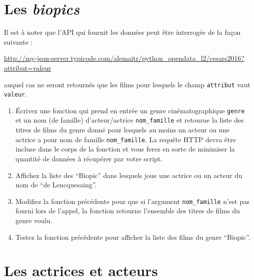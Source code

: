 \documentclass[11pt,a4paper]{article}
\begin{document}
\section{Les \emph{biopics}}

Il est à noter que l'API qui fournit les données peut être interrogée de la façon suivante :
\begin{center}
    \url{http://my-json-server.typicode.com/alemaitr/python_opendata_l2/cesars2016?attribut=valeur}
\end{center}
auquel cas ne seront retournés que les films pour lesquels le champ \verb+attribut+ vaut \verb+valeur+.


\begin{enumerate}
    \item Écrivez une fonction qui prend en entrée un genre cinématographique \verb+genre+ et un nom (de famille) d'acteur/actrice \verb+nom_famille+ et retourne la liste des titres de films du genre donné pour lesquels au moins un acteur ou une actrice a pour nom de famille \verb+nom_famille+.
    La requête HTTP devra être incluse dans le corps de la fonction et vous ferez en sorte de minimiser la quantité de données à récupérer par votre script.

    \item Affichez la liste des ``Biopic'' dans lesquels joue une actrice ou un acteur du nom de ``de Lencquesaing''.
    \item Modifiez la fonction précédente pour que si l'argument \verb+nom_famille+ n'est pas fourni lors de l'appel, la fonction retourne l'ensemble des titres de films du genre voulu.
    \item Testez la fonction précédente pour afficher la liste des films du genre ``Biopic''.
   
\end{enumerate}



\section{Les actrices et acteurs}
\end{document}
